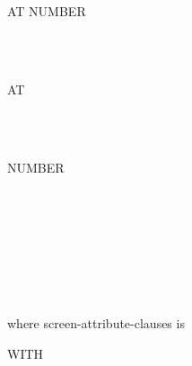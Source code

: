 \begin{1=}
  \identifier \\
\end{1=}
\begin{0-1}
   \mnemonicname
\end{0-1}
\begin{0-1}
\end{0-1}

\begin{1=}
  \identifier \\
\end{1=}

\begin{0+}
  \begin{1=}
    \begin{1+}
      AT  NUMBER
      \begin{1=}
        \identifier \\
        \integer
      \end{1=} \\

      AT
      \begin{1=}
         \\
         \\
      \end{1=}
      NUMBER
      \begin{1=}
        \identifier \\
        \integer
      \end{1=}
    \end{1+} \\

  \end{1=} \\

   \\
   \\
\end{0+}

where screen-attribute-clauses is

\begin{0-1}
WITH 
\end{0-1}

